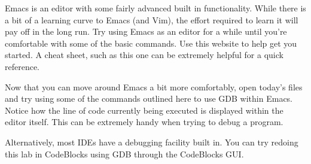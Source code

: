 \documentclass[12pt]{scrartcl}
\begin{document}
Emacs is an editor with some fairly advanced built in functionality.  While there 
is a bit of a learning curve to Emacs (and Vim), the effort required to learn it will 
pay off in the long run.  Try using Emacs as an editor for a while until you're 
comfortable with some of the basic commands.  Use this website to help get 
you started.  A cheat sheet, such as this one can be extremely helpful for a 
quick reference.

Now that you can move around Emacs a bit more comfortably, open today's 
files and try using some of the commands outlined here to use GDB within 
Emacs.  Notice how the line of code currently being executed is displayed 
within the editor itself.  This can be extremely handy when trying to debug 
a program.

Alternatively, most IDEs have a debugging facility built in.  You can try redoing 
this lab in CodeBlocks using GDB through the CodeBlocks GUI.  
\end{document}
